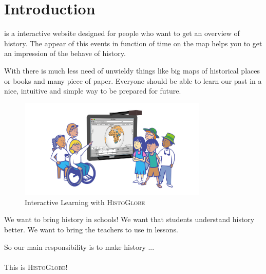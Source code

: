 \section{Introduction} %
\label{sec:introduction}

\HG is a interactive website designed for people who want to get an overview of history. The appear of this events in function of time on the map helps you to get an impression of the behave of history.

With \HG there is much less need of unwieldy things like big maps of historical places or books and many piece of paper. Everyone should be able to learn our past in a nice, intuitive and simple way to be prepared for future.

\begin{figure}[H]
	\centering
	\includegraphics[width=0.8\textwidth]{graphics/everybody.jpg}
	\caption{Interactive Learning with \textsc{HistoGlobe}}
	\label{fig:everybody}
\end{figure}

We want to bring history in schools! We want that students understand history better. We want to bring the teachers to use \HG in lessons.

So our main responsibility is to make history ...
\\
\\
This is \textsc{HistoGlobe}!

